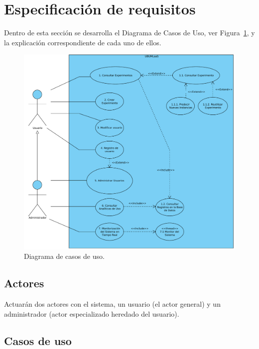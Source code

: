\section{Especificación de requisitos}

Dentro de esta sección se desarrolla el Diagrama de Casos de Uso, ver Figura~\ref{img:diagrama-casos-uso}, y la explicación correspondiente de cada uno de ellos.

\begin{figure}[h!]
	\centering
	\includegraphics[scale=0.5]{../img/anexos/requisitos/Casos-de-uso}
	\caption{Diagrama de casos de uso.}\label{img:diagrama-casos-uso}
\end{figure}

\subsection{Actores}
Actuarán dos actores con el sistema, un usuario (el actor general) y un administrador (actor especializado heredado del usuario).

\subsection{Casos de uso}\label{casos-de-uso}


